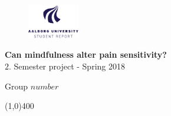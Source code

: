 \clearpage
\thispagestyle{empty}

\begin{figure}[H]
	\raggedleft
	\includegraphics[width=0.2\textwidth]{setup/aau_logo_en.pdf}
\end{figure} 

\vspace{5 cm}

\begin{center}	
	\begin{Huge}
		\textbf{Can mindfulness alter pain sensitivity?}\\
		\vspace{5 mm}
		$2.$ Semester project - Spring 2018\\
		\vspace{3 mm}
	\end{Huge}
	{\Large Group $number$}
\end{center}
\vspace*{\fill}

\begin{center}
	\line(1,0){400}
\end{center}

